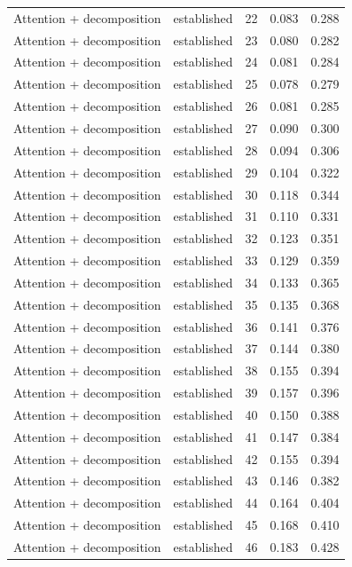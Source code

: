 \begin{tabular}{llrrr}
Attention + decomposition & established & 22 & 0.083 & 0.288 \\
Attention + decomposition & established & 23 & 0.080 & 0.282 \\
Attention + decomposition & established & 24 & 0.081 & 0.284 \\
Attention + decomposition & established & 25 & 0.078 & 0.279 \\
Attention + decomposition & established & 26 & 0.081 & 0.285 \\
Attention + decomposition & established & 27 & 0.090 & 0.300 \\
Attention + decomposition & established & 28 & 0.094 & 0.306 \\
Attention + decomposition & established & 29 & 0.104 & 0.322 \\
Attention + decomposition & established & 30 & 0.118 & 0.344 \\
Attention + decomposition & established & 31 & 0.110 & 0.331 \\
Attention + decomposition & established & 32 & 0.123 & 0.351 \\
Attention + decomposition & established & 33 & 0.129 & 0.359 \\
Attention + decomposition & established & 34 & 0.133 & 0.365 \\
Attention + decomposition & established & 35 & 0.135 & 0.368 \\
Attention + decomposition & established & 36 & 0.141 & 0.376 \\
Attention + decomposition & established & 37 & 0.144 & 0.380 \\
Attention + decomposition & established & 38 & 0.155 & 0.394 \\
Attention + decomposition & established & 39 & 0.157 & 0.396 \\
Attention + decomposition & established & 40 & 0.150 & 0.388 \\
Attention + decomposition & established & 41 & 0.147 & 0.384 \\
Attention + decomposition & established & 42 & 0.155 & 0.394 \\
Attention + decomposition & established & 43 & 0.146 & 0.382 \\
Attention + decomposition & established & 44 & 0.164 & 0.404 \\
Attention + decomposition & established & 45 & 0.168 & 0.410 \\
Attention + decomposition & established & 46 & 0.183 & 0.428 \\

\end{tabular}
